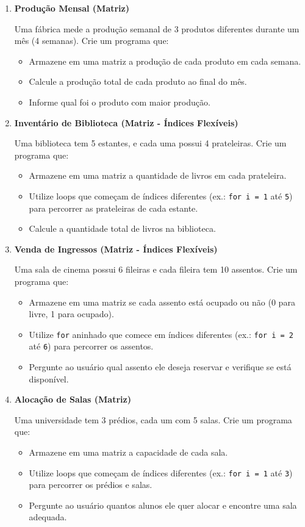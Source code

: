 \documentclass{article}
\begin{document}
\begin{enumerate}
\item \textbf{Produção Mensal (Matriz)}

Uma fábrica mede a produção semanal de 3 produtos diferentes durante um mês (4 semanas). Crie um programa que:
\begin{itemize}
    \item Armazene em uma matriz a produção de cada produto em cada semana.
    \item Calcule a produção total de cada produto ao final do mês.
    \item Informe qual foi o produto com maior produção.
\end{itemize}

\item \textbf{Inventário de Biblioteca (Matriz - Índices Flexíveis)}

Uma biblioteca tem 5 estantes, e cada uma possui 4 prateleiras. Crie um programa que:
\begin{itemize}
    \item Armazene em uma matriz a quantidade de livros em cada prateleira.
    \item Utilize loops que começam de índices diferentes (ex.: \texttt{for i = 1} até \texttt{5}) para percorrer as prateleiras de cada estante.
    \item Calcule a quantidade total de livros na biblioteca.
\end{itemize}

\item \textbf{Venda de Ingressos (Matriz - Índices Flexíveis)}

Uma sala de cinema possui 6 fileiras e cada fileira tem 10 assentos. Crie um programa que:
\begin{itemize}
    \item Armazene em uma matriz se cada assento está ocupado ou não (0 para livre, 1 para ocupado).
    \item Utilize \texttt{for} aninhado que comece em índices diferentes (ex.: \texttt{for i = 2} até \texttt{6}) para percorrer os assentos.
    \item Pergunte ao usuário qual assento ele deseja reservar e verifique se está disponível.
\end{itemize}

\item \textbf{Alocação de Salas (Matriz)}

Uma universidade tem 3 prédios, cada um com 5 salas. Crie um programa que:
\begin{itemize}
    \item Armazene em uma matriz a capacidade de cada sala.
    \item Utilize loops que começam de índices diferentes (ex.: \texttt{for i = 1} até \texttt{3}) para percorrer os prédios e salas.
    \item Pergunte ao usuário quantos alunos ele quer alocar e encontre uma sala adequada.
\end{itemize}

\end{enumerate}
\end{document}
